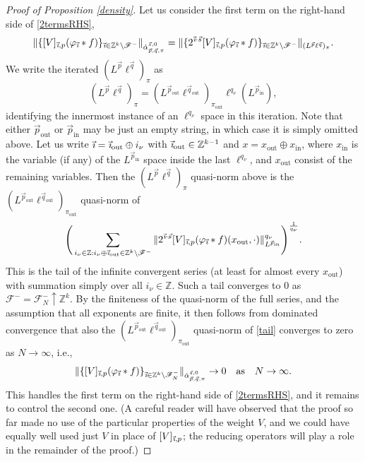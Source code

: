\documentclass[11pt, reqno]{amsart}
\theoremstyle{definition}
\theoremstyle{remark}
\numberwithin{equation}{section}
\newcommand{\Fs}{\mathscr F}
\newcommand{\Z}{\mathbb Z}
\newcommand{\vi}{\vec{\textit{\i}}}
\newcommand{\vp}{\vec p}
\newcommand{\vq}{\vec q}
\newcommand{\vs}{\vec s}
\newcommand{\Red}[3]{[#1]_{#2,#3}}
\newcommand{\Norm}[2]{\|#1\|_{#2}}
\begin{document}
\begin{proof}[Proof of Proposition \ref{density}]
Let us consider the first term on the right-hand side of \eqref{2termsRHS},
\begin{equation*}
\Norm{\{\Red{V}{\vi}{p}(\varphi_{\vi}*f)\}_{\vi\in\Z^k\setminus\Fs^-}}{\dot \alpha_{\vec p,\vec q,\pi}^{\vec s,0}}
=\Norm{\{2^{\vi\cdot\vs}\Red{V}{\vi}{p}(\varphi_{\vi}*f)\}_{\vi\in\Z^k\setminus\Fs^-}}{(L^{\vp}\ell^{\vq})_\pi}.
\end{equation*}
We write the iterated $(L^{\vp}\ell^{\vq})_\pi$ as
\begin{equation*}
(L^{\vp}\ell^{\vq})_\pi=
(L^{\vp_{\operatorname{out}}}\ell^{\vq_{\operatorname{out}}})_{\pi_{\operatorname{out}}}\ell^{q_\nu}
(L^{\vp_{\operatorname{in}}}),
\end{equation*}
identifying the innermost instance of an $\ell^{q_\nu}$ space in this iteration. Note that either $\vp_{\operatorname{out}}$ or $\vp_{\operatorname{in}}$ may be just an empty string, in which case it is simply omitted above.
Let us write $\vi=\vi_{\operatorname{out}}\oplus i_{\nu}$ with
$\vi_{\operatorname{out}}\in\Z^{k-1}$
and $x=x_{\operatorname{out}}\oplus x_{\operatorname{in}}$, where $x_{\operatorname{in}}$ is the variable (if any) of the $L^{\vp_{\operatorname{in}}}$
space inside the last $\ell^{q_{\nu}}$, and $x_{\operatorname{out}}$ consist of the remaining variables. Then the $(L^{\vp}\ell^{\vq})_\pi$ quasi-norm above is the
$(L^{\vp_{\operatorname{out}}}\ell^{\vq_{\operatorname{out}}})_{\pi_{\operatorname{out}}}$ quasi-norm of
\begin{equation}\label{tail}
\Bigg(\sum_{i_\nu\in\Z: i_\nu\oplus\vi_{\operatorname{out}}\in\Z^k\setminus\Fs^-}
\Norm{2^{\vi\cdot\vs}\Red{V}{\vi}{p}(\varphi_{\vi}*f)(x_{\operatorname{out}},\cdot)}
{L^{\vp_{\operatorname{in}}}}^{q_\nu}\Bigg)^{\frac{1}{q_\nu}}.
\end{equation}
This is the tail of the infinite convergent series (at least for almost every $x_{\operatorname{out}}$) with summation simply over all $i_\nu\in\Z$. Such a tail converges to $0$
as $\Fs^-=\Fs_N^-\uparrow\Z^k$. By the finiteness of the quasi-norm of the full series, and the assumption that all exponents are finite, it then follows from dominated convergence that also the $(L^{\vp_{\operatorname{out}}}\ell^{\vq_{\operatorname{out}}})_{\pi_{\operatorname{out}}}$ quasi-norm of \eqref{tail} converges to zero as $N\to\infty$, i.e.,
\begin{equation*}
\Norm{\{\Red{V}{\vi}{p}(\varphi_{\vi}*f)\}_{\vi\in\Z^k\setminus\Fs_N^-}}{\dot \alpha_{\vec p,\vec q,\pi}^{\vec s,0}}
\to 0\quad\text{as}\quad N\to\infty.
\end{equation*}
This handles the first term on the right-hand side of \eqref{2termsRHS}, and it remains to control the second one. (A careful reader will have observed that the proof so far made no use of the particular properties of the weight $V$, and we could have equally well used just $V$ in place of $\Red{V}{\vi}{p}$; the reducing operators will play a role in the remainder of the proof.)


\end{proof}
\end{document}
